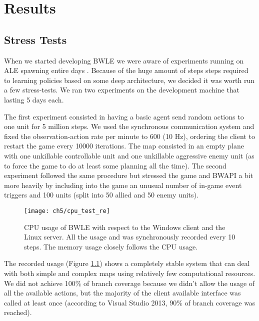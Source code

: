 \chapter{Results}


\section{Stress Tests}

When we started developing BWLE we were aware of experiments running on ALE
spawning entire days \citep{mnih2015human}. Because of the huge amount of steps
steps required to learning policies based on some deep architecture, we decided
it was worth run a few stress-tests. We ran two experiments on the development
machine that lasting 5 days each.

The first experiment consisted in having a basic agent send random actions to
one unit for 5 million steps. We used the synchronous communication system and
fixed the observation-action rate per minute to 600 (10 Hz), ordering the client
to restart the game every 10000 iterations. The map consisted in an empty plane
with one unkillable controllable unit and one unkillable aggressive enemy unit
(as to force the game to do at least some planning all the time). The second
experiment followed the same procedure but stressed the game and BWAPI a bit
more heavily by including into the game an unusual number of in-game event
triggers and 100 units (split into 50 allied and 50 enemy units).

\begin{figure}[h]
    \centering
    \texttt{[image: ch5/cpu\_test\_re]}
    \caption{CPU usage of BWLE with respect to the Windows client and the Linux
      server. All the usage and was synchronously recorded every 10 steps. The
      memory usage closely follows the CPU usage.}
    \label{fig:fst_usage}
\end{figure}

The recorded usage (Figure \ref{fig:fst_usage}) shows a completely stable system
that can deal with both simple and complex maps using relatively few
computational resources. We did not achieve 100\% of branch coverage because we
didn't allow the usage of all the available actions, but the majority of the
client available interface was called at least once (according to Visual Studio
2013, 90\% of branch coverage was reached).

